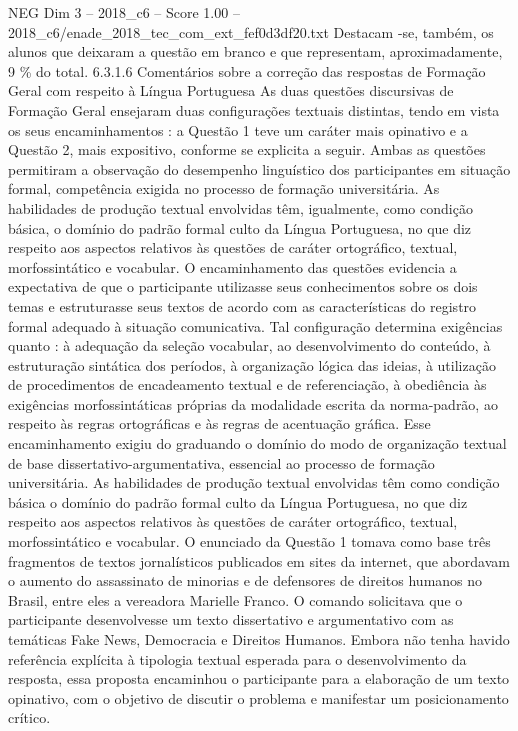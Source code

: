 \begin{textsample}{NEG Dim 3 – 2018\_c6 – Score 1.00 – 2018\_c6/enade\_2018\_tec\_com\_ext\_fef0d3df20.txt}
Destacam -se, também, os alunos que deixaram a questão em branco e que representam, aproximadamente, 9 \% do total. 6.3.1.6 Comentários sobre a correção das respostas de Formação Geral com respeito à Língua Portuguesa As duas questões discursivas de Formação Geral ensejaram duas configurações textuais distintas, tendo em vista os seus encaminhamentos : a Questão 1 teve um caráter mais opinativo e a Questão 2, mais expositivo, conforme se explicita a seguir.
Ambas as questões permitiram a observação do desempenho linguístico dos participantes em situação formal, competência exigida no processo de formação universitária.
As habilidades de produção textual envolvidas têm, igualmente, como condição básica, o domínio do padrão formal culto da Língua Portuguesa, no que diz respeito aos aspectos relativos às questões de caráter ortográfico, textual, morfossintático e vocabular.
O encaminhamento das questões evidencia a expectativa de que o participante utilizasse seus conhecimentos sobre os dois temas e estruturasse seus textos de acordo com as características do registro formal adequado à situação comunicativa.
Tal configuração determina exigências quanto : à adequação da seleção vocabular, ao desenvolvimento do conteúdo, à estruturação sintática dos períodos, à organização lógica das ideias, à utilização de procedimentos de encadeamento textual e de referenciação, à obediência às exigências morfossintáticas próprias da modalidade escrita da norma-padrão, ao respeito às regras ortográficas e às regras de acentuação gráfica.
Esse encaminhamento exigiu do graduando o domínio do modo de organização textual de base dissertativo-argumentativa, essencial ao processo de formação universitária.
As habilidades de produção textual envolvidas têm como condição básica o domínio do padrão formal culto da Língua Portuguesa, no que diz respeito aos aspectos relativos às questões de caráter ortográfico, textual, morfossintático e vocabular.
O enunciado da Questão 1 tomava como base três fragmentos de textos jornalísticos publicados em sites da internet, que abordavam o aumento do assassinato de minorias e de defensores de direitos humanos no Brasil, entre eles a vereadora Marielle Franco.
O comando solicitava que o participante desenvolvesse um texto dissertativo e argumentativo com as temáticas Fake News, Democracia e Direitos Humanos.
Embora não tenha havido referência explícita à tipologia textual esperada para o desenvolvimento da resposta, essa proposta encaminhou o participante para a elaboração de um texto opinativo, com o objetivo de discutir o problema e manifestar um posicionamento crítico.

\end{textsample}
